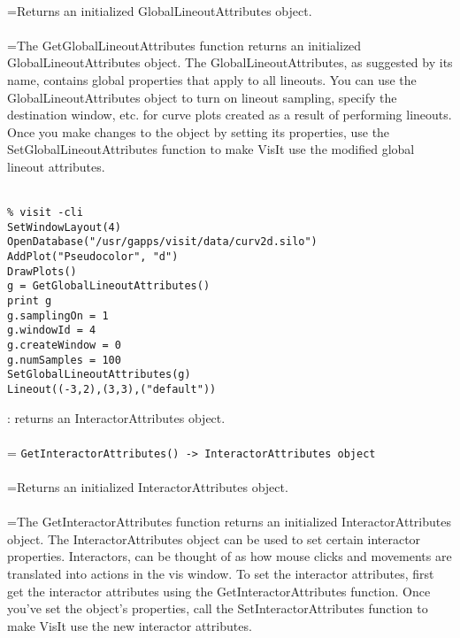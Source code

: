 \documentclass[10pt,a4paper]{report}
\begin{document}
 \\ 
\hangindent=\parindent Returns an initialized GlobalLineoutAttributes object. \\[-3mm] 

 \\ 
\hangindent=\parindent The GetGlobalLineoutAttributes function returns an initialized GlobalLineoutAttributes object. The GlobalLineoutAttributes, as suggested by its name, contains global properties that apply to all lineouts. You can use the GlobalLineoutAttributes object to turn on lineout sampling, specify the destination window, etc. for curve plots created as a result of performing lineouts. Once you make changes to the object by setting its properties, use the SetGlobalLineoutAttributes function to make VisIt use the modified global lineout attributes. \\[-3mm] 

\\[-6mm]
\begin{verbatim}% visit -cli
SetWindowLayout(4)
OpenDatabase("/usr/gapps/visit/data/curv2d.silo")
AddPlot("Pseudocolor", "d")
DrawPlots()
g = GetGlobalLineoutAttributes()
print g
g.samplingOn = 1
g.windowId = 4
g.createWindow = 0
g.numSamples = 100
SetGlobalLineoutAttributes(g)
Lineout((-3,2),(3,3),("default"))
\end{verbatim}
\newpage


{}
: returns an InteractorAttributes object.\\[-3mm]

 \\ 
\hangindent=\parindent 
\verb!GetInteractorAttributes() -> InteractorAttributes object!\\ [-3mm]

 \\ 
\hangindent=\parindent Returns an initialized InteractorAttributes object. \\[-3mm] 

 \\ 
\hangindent=\parindent The GetInteractorAttributes function returns an initialized InteractorAttributes object. The InteractorAttributes object can be used to set certain interactor properties. Interactors, can be thought of as how mouse clicks and movements are translated into actions in the vis window. To set the interactor attributes, first get the interactor attributes using the GetInteractorAttributes function. Once you've set the object's properties, call the SetInteractorAttributes function to make VisIt use the new interactor attributes. \\[-3mm] 
\end{document}
